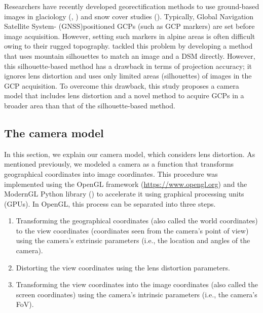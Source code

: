 \documentclass{article}
\providecommand{\tightlist}{%
  \setlength{\itemsep}{0pt}\setlength{\parskip}{0pt}}
\begin{document}
Researchers have recently developed georectification methods to use ground-based images in glaciology (\cite{Messerli2015GeoInst}, \cite{Hulton2020PyTrx}) and snow cover studies (\cite{Portenier2020Cryosphere}). Typically, Global Navigation Satellite System- (GNSS)positioned GCPs (such as GCP markers) are set before image acquisition. However, setting such markers in alpine areas is often difficult owing to their rugged topography. \cite{Portenier2020Cryosphere} tackled this problem by developing a method that uses mountain silhouettes to match an image and a DSM directly. However, this silhouette-based method has a drawback in terms of projection accuracy; it ignores lens distortion and uses only limited areas (silhouettes) of images in the GCP acquisition. To overcome this drawback, this study proposes a camera model that includes lens distortion and a novel method to acquire GCPs in a broader area than that of the silhouette-based method.

\hypertarget{modeling-and-estimating-camera-parameters}{%
\subsection{The camera model}\label{modeling-and-estimating-camera-parameters}}

In this section, we explain our camera model, which considers lens distortion. As mentioned previously, we modeled a camera as a function that transforms geographical coordinates into image coordinates. This procedure was implemented using the OpenGL framework (\url{https://www.opengl.org}) and the ModernGL Python library (\cite{moderngl}) to accelerate it using graphical processing units (GPUs). In OpenGL, this process can be separated into three steps.

\begin{enumerate}
\def\labelenumi{\arabic{enumi}.}
\tightlist
\item
  Transforming the geographical coordinates (also called the world coordinates) to the view coordinates (coordinates seen from the camera's point of view) using the camera's extrinsic parameters (i.e., the location and angles of the camera).
\item
  Distorting the view coordinates using the lens distortion parameters.
\item
  Transforming the view coordinates into the image coordinates (also called the screen coordinates) using the camera's intrinsic parameters (i.e., the camera's FoV).
\end{enumerate}
\end{document}
